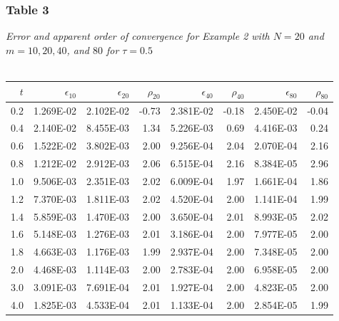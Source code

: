 \documentclass[letterpaper, 12pt]{article}
\begin{document}
	\subsubsection*{Table 3} \small\textit{Error and apparent order of convergence for Example 2 with $N=20$ and\\$m=10,20,40$, and $80$ for $\tau=0.5$} \\\\
	\normalsize
	\begin{tabular}{r||rrrrrrr}
		\hline
		$t$  &$\epsilon_{10}$  &$\epsilon_{20}$  &$\rho_{20}$  &$\epsilon_{40}$  &$\rho_{40}$  &$\epsilon_{80}$  &$\rho_{80}$ \\ 
		\hline
		0.2    &1.269E-02    &2.102E-02        &-0.73    &2.381E-02        &-0.18    &2.450E-02        &-0.04 \\ 
		0.4    &2.140E-02    &8.455E-03         &1.34    &5.226E-03         &0.69    &4.416E-03         &0.24 \\ 
		0.6    &1.522E-02    &3.802E-03         &2.00    &9.256E-04         &2.04    &2.070E-04         &2.16 \\ 
		0.8    &1.212E-02    &2.912E-03         &2.06    &6.515E-04         &2.16    &8.384E-05         &2.96 \\ 
		1.0    &9.506E-03    &2.351E-03         &2.02    &6.009E-04         &1.97    &1.661E-04         &1.86 \\ 
		1.2    &7.370E-03    &1.811E-03         &2.02    &4.520E-04         &2.00    &1.141E-04         &1.99 \\ 
		1.4    &5.859E-03    &1.470E-03         &2.00    &3.650E-04         &2.01    &8.993E-05         &2.02 \\ 
		1.6    &5.148E-03    &1.276E-03         &2.01    &3.186E-04         &2.00    &7.977E-05         &2.00 \\ 
		1.8    &4.663E-03    &1.176E-03         &1.99    &2.937E-04         &2.00    &7.348E-05         &2.00 \\ 
		2.0    &4.468E-03    &1.114E-03         &2.00    &2.783E-04         &2.00    &6.958E-05         &2.00 \\ 
		3.0    &3.091E-03    &7.691E-04         &2.01    &1.927E-04         &2.00    &4.823E-05         &2.00 \\ 
		4.0    &1.825E-03    &4.533E-04         &2.01    &1.133E-04         &2.00    &2.854E-05         &1.99 \\ 
		\hline
	\end{tabular}
	
\end{document}
